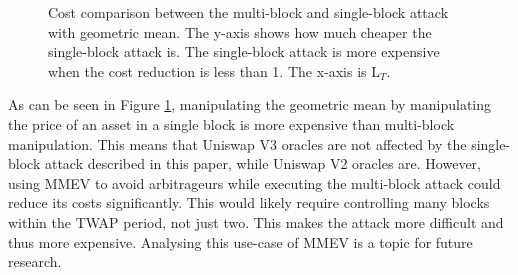 \begin{figure}[h]
\caption{Cost comparison between the multi-block and single-block attack with geometric mean. The y-axis shows how much cheaper the single-block attack is. The single-block attack is more expensive when the cost reduction is less than 1. The x-axis is L$_T$.}
\label{figure_geometric}
\end{figure}

As can be seen in Figure \ref{figure_geometric}, manipulating the geometric mean by manipulating the price of an asset in a single block is more expensive than multi-block manipulation. This means that Uniswap V3 oracles are not affected by the single-block attack described in this paper, while Uniswap V2 oracles are.
However, using MMEV to avoid arbitrageurs while executing the multi-block attack could reduce its costs significantly. This would likely require controlling many blocks within the TWAP period, not just two. This makes the attack more difficult and thus more expensive. Analysing this use-case of MMEV is a topic for future research.

